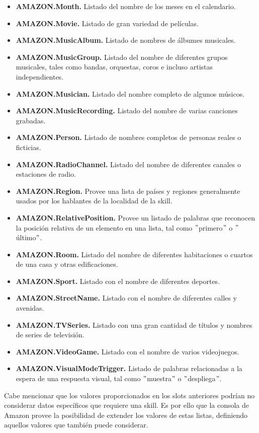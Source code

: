 \begin{itemize}
  \item \textbf{AMAZON.Month.} Listado del nombre de los meses en el calendario.
  \item \textbf{AMAZON.Movie.} Listado de gran variedad de películas.
  \item \textbf{AMAZON.MusicAlbum.} Listado de nombres de álbumes musicales.
  \item \textbf{AMAZON.MusicGroup.} Listado del nombre de diferentes grupos musicales, tales como bandas, orquestas, coros e incluso artistas independientes.
  \item \textbf{AMAZON.Musician.} Listado del nombre completo de algunos músicos.
  \item \textbf{AMAZON.MusicRecording.} Listado del nombre de varias canciones grabadas.
  \item \textbf{AMAZON.Person.} Listado de nombres completos de personas reales o ficticias.
  \item \textbf{AMAZON.RadioChannel.} Listado del nombre de diferentes canales o estaciones de radio.
  \item \textbf{AMAZON.Region.} Provee una lista de países y regiones generalmente usados por los hablantes de la localidad de la skill.
  \item \textbf{AMAZON.RelativePosition.} Provee un listado de palabras que reconocen la posición relativa de un elemento en una lista, tal como $"$primero$"$ o $"$último$"$.
  \item \textbf{AMAZON.Room.} Listado del nombre de diferentes habitaciones o cuartos de una casa y otras edificaciones.
  \item \textbf{AMAZON.Sport.} Listado con el nombre de diferentes deportes.
  \item \textbf{AMAZON.StreetName.} Listado con el nombre de diferentes calles y avenidas.
  \item \textbf{AMAZON.TVSeries.} Listado con una gran cantidad de títulos y nombres de series de televisión.
  \item \textbf{AMAZON.VideoGame.} Listado con el nombre de varios videojuegos.
  \item \textbf{AMAZON.VisualModeTrigger.} Listado de palabras relacionadas a la espera de una respuesta visual, tal como $"$muestra$"$ o $"$despliega$"$.
\end{itemize}

Cabe mencionar que los valores proporcionados en los slots anteriores podrían no considerar datos específicos que requiere una skill. Es por ello que la consola de Amazon provee la posibilidad de extender los valores de estas listas, definiendo aquellos valores que también puede considerar.

